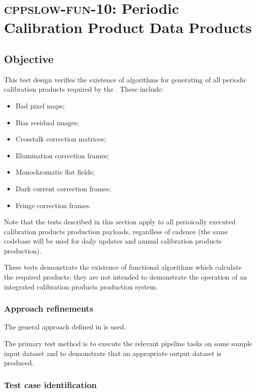 \section{\textsc{cppslow-fun-10}: Periodic Calibration Product Data Products}
\label{cppslow-fun-10}

\subsection{Objective}

This test design verifies the existence of algorithms for generating of all
periodic calibration products required by the . These include:

\begin{itemize}

  \item{Bad pixel maps;}
  \item{Bias residual images;}
  \item{Crosstalk correction matrices;}
  \item{Illumination correction frames;}
  \item{Monochromatic flat fields;}
  \item{Dark current correction frames;}
  \item{Fringe correction frames.}

\end{itemize}

Note that the tests described in this section apply to all perioically
executed calibration products production payloads, regardless of cadence (the
same codebase will be used for daily updates and annual calibration products
production).

These tests demonstrate the existence of functional algorithms which calculate
the required products; they are not intended to demonstrate the operation of
an integrated calibration products production system.

\subsubsection{Approach refinements}

The general approach defined in  is used.

The primary test method is to execute the relevant pipeline tasks on some
sample input dataset and to demonstrate that an appropriate output dataset is
produced.

\subsubsection{Test case identification}

